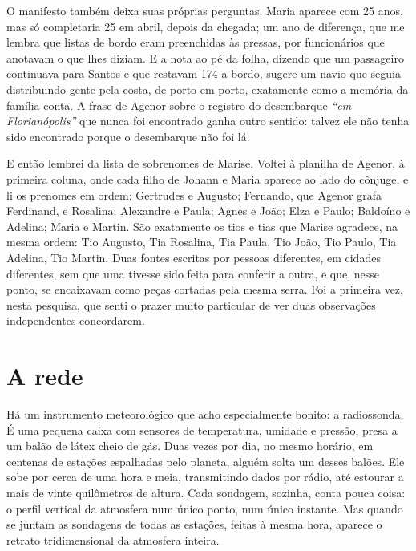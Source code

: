 \documentclass[
  brazilian,
  11pt,
  openany]{book}
\begin{document}
O manifesto também deixa suas próprias perguntas. Maria aparece com 25
anos, mas só completaria 25 em abril, depois da chegada; um ano de
diferença, que me lembra que listas de bordo eram preenchidas às
pressas, por funcionários que anotavam o que lhes diziam. E a nota ao pé
da folha, dizendo que um passageiro continuava para Santos e que
restavam 174 a bordo, sugere um navio que seguia distribuindo gente pela
costa, de porto em porto, exatamente como a memória da família conta. A
frase de Agenor sobre o registro do desembarque \emph{``em
Florianópolis''} que nunca foi encontrado ganha outro sentido: talvez
ele não tenha sido encontrado porque o desembarque não foi lá.

E então lembrei da lista de sobrenomes de Marise. Voltei à planilha de
Agenor, à primeira coluna, onde cada filho de Johann e Maria aparece ao
lado do cônjuge, e li os prenomes em ordem: Gertrudes e Augusto;
Fernando, que Agenor grafa Ferdinand, e Rosalina; Alexandre e Paula;
Agnes e João; Elza e Paulo; Baldoíno e Adelina; Maria e Martin. São
exatamente os tios e tias que Marise agradece, na mesma ordem: Tio
Augusto, Tia Rosalina, Tia Paula, Tio João, Tio Paulo, Tia Adelina, Tio
Martin. Duas fontes escritas por pessoas diferentes, em cidades
diferentes, sem que uma tivesse sido feita para conferir a outra, e que,
nesse ponto, se encaixavam como peças cortadas pela mesma serra. Foi a
primeira vez, nesta pesquisa, que senti o prazer muito particular de ver
duas observações independentes concordarem.

\section{A rede}\label{a-rede}

Há um instrumento meteorológico que acho especialmente bonito: a
radiossonda. É uma pequena caixa com sensores de temperatura, umidade e
pressão, presa a um balão de látex cheio de gás. Duas vezes por dia, no
mesmo horário, em centenas de estações espalhadas pelo planeta, alguém
solta um desses balões. Ele sobe por cerca de uma hora e meia,
transmitindo dados por rádio, até estourar a mais de vinte quilômetros
de altura. Cada sondagem, sozinha, conta pouca coisa: o perfil vertical
da atmosfera num único ponto, num único instante. Mas quando se juntam
as sondagens de todas as estações, feitas à mesma hora, aparece o
retrato tridimensional da atmosfera inteira.
\end{document}
